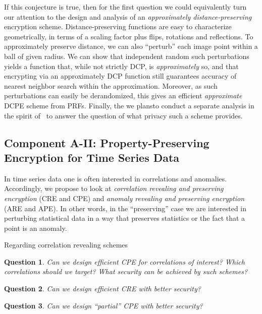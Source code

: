 \documentclass[11pt]{article}
\newtheorem{question}{Question}[section]
\theoremstyle{remark}
\begin{document}
If this conjecture is true, then for the first question we could equivalently turn our attention to the design and analysis of  an \emph{approximately distance-preserving} encryption scheme. 
Distance-preserving functions are easy to characterize geometrically, in terms of a scaling factor plus flips, rotations and reflections.  To approximately preserve distance, we can also  ``perturb'' each image point within a ball of given radius.  
We can show that independent random such perturbations yields a function that, while not strictly DCP, is \emph{approximately} so, and that encrypting via an approximately DCP function still guarantees accuracy of nearest neighbor  search within the approximation.  Moreover, as such perturbations can easily be derandomized, this gives an efficient \emph{approximate} DCPE scheme from PRFs.  Finally, the we plansto conduct a separate analysis in the spirit of~\cite{C:BolCheOne11} to answer the question of what privacy such a scheme provides.  

\subsection{Component A-II:  Property-Preserving Encryption for Time Series Data} 

In time series data one is often interested in correlations and anomalies.  Accordingly, we propose to look at \emph{correlation revealing and preserving encryption}  (CRE and CPE) and \emph{anomaly revealing and preserving encryption} (ARE and APE).  In other words, in the ``preserving'' case we are interested in perturbing statistical data in a way that preserves statistics or the fact that a point is an anomaly.  

Regarding correlation revealing schemes
\begin{question}
Can we design efficient CPE for correlations of interest?  Which correlations should we target?  What security can be achieved by such schemes?
\end{question}


\begin{question}
Can we design efficient CRE with better security?
\end{question}

\begin{question}
Can we design ``partial'' CPE with better security?
\end{question}
\end{document}
